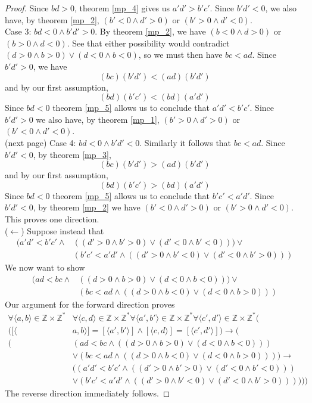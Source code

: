 \documentclass{report}
\begin{document}
\begin{proof}
Since $bd>0$, theorem \ref{mp_4} gives us $a'd'>b'c'$. Since $b'd'<0$, we also have, by theorem \ref{mp_2}, $(b'<0\land d'>0)$ or $(b'>0\land d'<0)$.\\
\indent Case 3: $bd<0\land b'd'>0$. By theorem \ref{mp_2}, we have $(b<0\land d>0)$ or $(b>0\land d<0)$. See that either possibility would contradict $(d>0\land b>0)\lor(d<0\land b<0)$, so we must 
then have $bc<ad$. Since $b'd'>0$, we have
\begin{equation*}
(bc)(b'd')<(ad)(b'd')
\end{equation*}
and by our first assumption,
\begin{equation*}
(bd)(b'c')<(bd)(a'd')
\end{equation*}
Since $bd<0$ theorem \ref{mp_5} allows us to conclude that $a'd'<b'c'$. Since $b'd'>0$ we also have, by theorem \ref{mp_1}, $(b'>0\land d'>0)$ or $(b'<0\land d'<0)$.\\
(next page)\newpage
Case 4: $bd<0\land b'd'<0$. Similarly it follows that $bc<ad$. Since $b'd'<0$, by theorem \ref{mp_3},
\begin{equation*}
(bc)(b'd')>(ad)(b'd')
\end{equation*}
and by our first assumption, 
\begin{equation*}
(bd)(b'c')>(bd)(a'd')
\end{equation*}
Since $bd<0$ theorem \ref{mp_5} allows us to conclude that $b'c'<a'd'$. Since $b'd'<0$, by theorem \ref{mp_2} we have $(b'<0\land d'>0)$ or $(b'>0\land d'<0)$. This proves one direction.\\
\indent ($\leftarrow$) Suppose instead that
\begin{align*}
(a'd'<b'c'\land&((d'>0\land b'>0)\lor(d'<0\land b'<0)))\lor\\
&(b'c'<a'd'\land((d'>0\land b'<0)\lor(d'<0\land b'>0)))
\end{align*}
We now want to show
\begin{align*}
(ad<bc\land&((d>0\land b>0)\lor(d<0\land b<0)))\lor\\
&(bc<ad\land((d>0\land b<0)\lor(d<0\land b>0)))
\end{align*}
Our argument for the forward direction proves
\begin{align*}
\forall\langle a,b\rangle\in\mathbb Z\times\mathbb Z^*&\forall\langle c,d\rangle\in\mathbb Z\times\mathbb Z^*
\forall\langle a',b'\rangle\in\mathbb Z\times\mathbb Z^*\forall\langle c',d'\rangle\in\mathbb Z\times\mathbb Z^*(\\
([\langle&a,b\rangle]=[\langle a',b'\rangle]\land
[\langle c,d\rangle]=[\langle c',d'\rangle])\to(\\
(&(ad<bc\land((d>0\land b>0)\lor(d<0\land b<0)))\\
&\lor(bc<ad\land((d>0\land b<0)\lor(d<0\land b>0))))\to\\
&((a'd'<b'c'\land((d'>0\land b'>0)\lor(d'<0\land b'<0)))\\
&\lor(b'c'<a'd'\land((d'>0\land b'<0)\lor(d'<0\land b'>0))))))
\end{align*}
The reverse direction immediately follows.
\end{proof}
\end{document}
